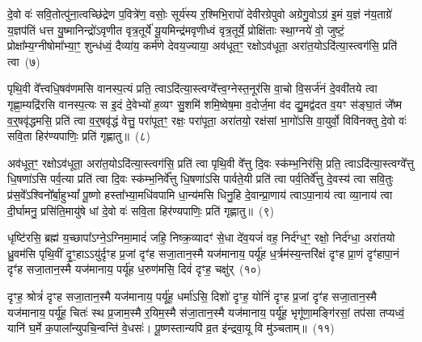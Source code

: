 {\anuvakamend[{मा त्वा॒ षट्च॑त्वारिꣳशच्च}]}

दे॒वो वः॑ सवि॒तोत्पु॑ना॒त्वच्छि॑द्रेण प॒वित्रे॑ण॒ वसोः॒ सूर्य॑स्य र॒श्मिभि॒रापो॑ देवीरग्रेपुवो अग्रेगु॒वो\-ऽग्र॑ इ॒मं य॒ज्ञं न॑य॒ताग्रे॑ य॒ज्ञप॑तिं धत्त यु॒ष्मानिन्द्रो॑\-ऽवृणीत वृत्र॒तूर्ये॑ यू॒यमिन्द्र॑मवृणीध्वं वृत्र॒तूर्ये॒ प्रोक्षि॑ताः स्था॒ग्नये॑ वो॒ जुष्टं॒ प्रोक्षा᳚म्य॒ग्नी\-षोमा᳚भ्या॒ꣳ॒ शुन्ध॑ध्वं॒ दैव्या॑य॒ कर्म॑णे देवय॒ज्याया॒ अव॑धूत॒ꣳ॒ रक्षो\-ऽव॑धूता॒ अरा॑त॒यो\-ऽदि॑त्या॒स्त्वग॑सि॒ प्रति॑ त्वा~(७)

पृथि॒वी वे᳚त्त्वधि॒षव॑णमसि वानस्प॒त्यं प्रति॒ त्वा\-ऽदि॑त्या॒स्त्वग्वे᳚त्त्व॒ग्नेस्त॒नूर॑सि वा॒चो वि॒सर्ज॑नं दे॒ववी॑तये त्वा गृह्णा॒म्यद्रि॑रसि वानस्प॒त्यः स इ॒दं दे॒वेभ्यो॑ ह॒व्यꣳ सु॒शमि॑ शमि॒ष्वेष॒मा व॒दोर्ज॒मा व॑द द्यु॒मद्व॑दत व॒यꣳ स॑ङ्घा॒तं जे᳚ष्म व॒र्॒षवृ॑द्धमसि॒ प्रति॑ त्वा व॒र्॒षवृ॑द्धं वेत्तु॒ परा॑पूत॒ꣳ॒ रक्षः॒ परा॑पूता॒ अरा॑तयो॒ रक्ष॑सां भा॒गो॑\-ऽसि वा॒युर्वो॒ विवि॑नक्तु दे॒वो वः॑ सवि॒ता हिर॑ण्यपाणिः॒ प्रति॑ गृह्णातु॥~(८)

{\anuvakamend[{त्वा॒ भा॒ग एका॑\-दश च}]}

अव॑धूत॒ꣳ॒ रक्षो\-ऽव॑धूता॒ अरा॑त॒यो\-ऽदि॑त्या॒स्त्वग॑सि॒ प्रति॑ त्वा पृथि॒वी वे᳚त्तु दि॒वः स्क॑म्भ॒निर॑सि॒ प्रति॒ त्वा\-ऽदि॑त्या॒स्त्वग्वे᳚त्तु धि॒षणा॑\-ऽसि पर्व॒त्या प्रति॑ त्वा दि॒वः स्क॑म्भ॒निर्वे᳚त्तु धि॒षणा॑\-ऽसि पार्वते॒यी प्रति॑ त्वा पर्व॒तिर्वे᳚त्तु दे॒वस्य॑ त्वा सवि॒तुः प्र॑स॒वे᳚\-ऽश्विनो᳚र्बा॒हु\-भ्यां᳚ पू॒ष्णो हस्ता᳚भ्या॒मधि॑वपामि धा॒न्य॑मसि धिनु॒हि दे॒वान्प्रा॒णाय॑ त्वा\-ऽपा॒नाय॑ त्वा व्या॒नाय॑ त्वा दी॒र्घामनु॒ प्रसि॑ति॒मायु॑षे धां दे॒वो वः॑ सवि॒ता हिर॑ण्यपाणिः॒ प्रति॑ गृह्णातु॥~(९)

{\anuvakamend[{प्रा॒णाय॑ त्वा॒ पञ्च॑दश च}]}

धृष्टि॑रसि॒ ब्रह्म॑ य॒च्छापा᳚\-ऽग्ने॒\-ऽग्निमा॒मादं॑ जहि॒ निष्क्र॒व्यादꣳ॑ से॒धा दे॑व॒यजं॑ वह॒ निर्द॑ग्ध॒ꣳ॒ रक्षो॒ निर्द॑ग्धा॒ अरा॑तयो ध्रु॒वम॑सि पृथि॒वीं दृ॒ꣳ॒हा\-ऽऽ\-यु॑र्दृꣳह प्र॒जां दृꣳ॑ह सजा॒तान॒स्मै यज॑मानाय॒ पर्यू॑ह ध॒र्त्रम॑स्य॒न्तरि॑क्षं दृꣳह प्रा॒णं दृꣳ॑हापा॒नं दृꣳ॑ह सजा॒ता\-न॒स्मै यज॑मानाय॒ पर्यू॑ह ध॒रुण॑मसि॒ दिवं॑ दृꣳह॒ चक्षु॑र्~(१०)

दृꣳह॒ श्रोत्रं॑ दृꣳह सजा॒तान॒स्मै यज॑मानाय॒ पर्यू॑ह॒ धर्मा॑\-ऽसि॒ दिशो॑ दृꣳह॒ योनिं॑ दृꣳह प्र॒जां दृꣳ॑ह सजा॒तान॒स्मै यज॑मानाय॒ पर्यू॑ह॒ चितः॑ स्थ प्र॒जाम॒स्मै र॒यिम॒स्मै स॑जा॒तान॒स्मै यज॑मानाय॒ पर्यू॑ह॒ भृगू॑णा॒मङ्गि॑रसां॒ तप॑सा तप्यध्वं॒ यानि॑ घ॒र्मे क॒पाला᳚न्युपचि॒न्वन्ति॑ वे॒धसः॑। पू॒ष्णस्तान्यपि॑ व्र॒त इ॑न्द्रवा॒यू वि मु॑ञ्चताम्॥~(११)

{\anuvakamend[{चक्षु॑र॒ष्टाच॑त्वारिꣳशच्च}]}

